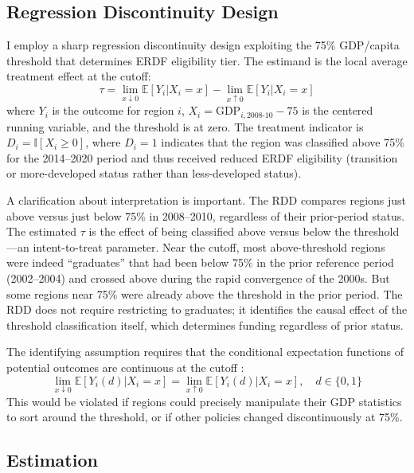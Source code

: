 \documentclass[12pt]{article}
\newcommand{\E}{\mathbb{E}}
\newcommand{\ind}{\mathbb{I}}
\begin{document}
\subsection{Regression Discontinuity Design}

I employ a sharp regression discontinuity design exploiting the 75\% GDP/capita threshold that determines ERDF eligibility tier. The estimand is the local average treatment effect at the cutoff:
\begin{equation}
\tau = \lim_{x \downarrow 0} \E[Y_i | X_i = x] - \lim_{x \uparrow 0} \E[Y_i | X_i = x]
\end{equation}
where $Y_i$ is the outcome for region $i$, $X_i = \text{GDP}_{i,2008\text{-}10} - 75$ is the centered running variable, and the threshold is at zero. The treatment indicator is $D_i = \ind[X_i \geq 0]$, where $D_i = 1$ indicates that the region was classified above 75\% for the 2014--2020 period and thus received reduced ERDF eligibility (transition or more-developed status rather than less-developed status).

A clarification about interpretation is important. The RDD compares regions just above versus just below 75\% in 2008--2010, regardless of their prior-period status. The estimated $\tau$ is the effect of being classified above versus below the threshold---an intent-to-treat parameter. Near the cutoff, most above-threshold regions were indeed ``graduates'' that had been below 75\% in the prior reference period (2002--2004) and crossed above during the rapid convergence of the 2000s. But some regions near 75\% were already above the threshold in the prior period. The RDD does not require restricting to graduates; it identifies the causal effect of the threshold classification itself, which determines funding regardless of prior status.

The identifying assumption requires that the conditional expectation functions of potential outcomes are continuous at the cutoff \citep{HahnToddVanderKlaauw2001, LeeLemieux2010}:
\begin{equation}
\lim_{x \downarrow 0} \E[Y_i(d) | X_i = x] = \lim_{x \uparrow 0} \E[Y_i(d) | X_i = x], \quad d \in \{0, 1\}
\end{equation}
This would be violated if regions could precisely manipulate their GDP statistics to sort around the threshold, or if other policies changed discontinuously at 75\%.

\subsection{Estimation}
\end{document}
